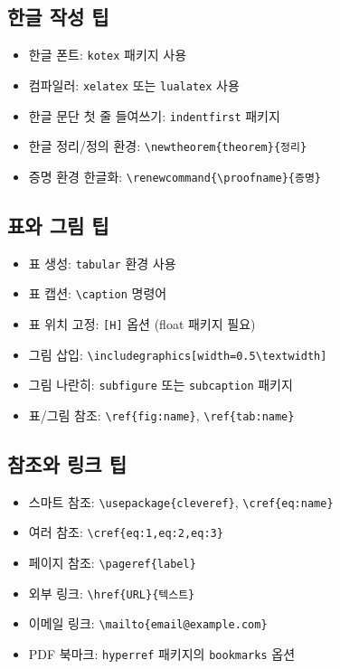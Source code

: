 \documentclass[12pt,a4paper]{article}
\begin{document}
\subsection{한글 작성 팁}
\begin{itemize}
    \item 한글 폰트: \texttt{kotex} 패키지 사용
    \item 컴파일러: \texttt{xelatex} 또는 \texttt{lualatex} 사용
    \item 한글 문단 첫 줄 들여쓰기: \texttt{indentfirst} 패키지
    \item 한글 정리/정의 환경: \texttt{\textbackslash newtheorem\{theorem\}\{정리\}}
    \item 증명 환경 한글화: \texttt{\textbackslash renewcommand\{\textbackslash proofname\}\{증명\}}
\end{itemize}

\subsection{표와 그림 팁}
\begin{itemize}
    \item 표 생성: \texttt{tabular} 환경 사용
    \item 표 캡션: \texttt{\textbackslash caption} 명령어
    \item 표 위치 고정: \texttt{[H]} 옵션 (float 패키지 필요)
    \item 그림 삽입: \texttt{\textbackslash includegraphics[width=0.5\textbackslash textwidth]}
    \item 그림 나란히: \texttt{subfigure} 또는 \texttt{subcaption} 패키지
    \item 표/그림 참조: \texttt{\textbackslash ref\{fig:name\}}, \texttt{\textbackslash ref\{tab:name\}}
\end{itemize}

\subsection{참조와 링크 팁}
\begin{itemize}
    \item 스마트 참조: \texttt{\textbackslash usepackage\{cleveref\}}, \texttt{\textbackslash cref\{eq:name\}}
    \item 여러 참조: \texttt{\textbackslash cref\{eq:1,eq:2,eq:3\}}
    \item 페이지 참조: \texttt{\textbackslash pageref\{label\}}
    \item 외부 링크: \texttt{\textbackslash href\{URL\}\{텍스트\}}
    \item 이메일 링크: \texttt{\textbackslash mailto\{email@example.com\}}
    \item PDF 북마크: \texttt{hyperref} 패키지의 \texttt{bookmarks} 옵션
\end{itemize}
\end{document}
